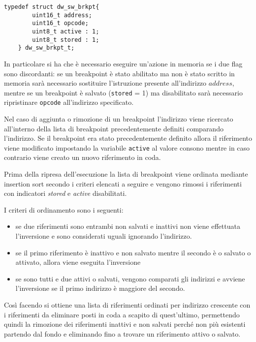 \noindent\begin{minipage}{\textwidth}
    \begin{lstlisting}[style=C, caption={Struttura utilizzata per il salvataggio dei riferimenti ai breakpoint software}, label=lst:dw-swbp-struct]
    typedef struct dw_sw_brkpt{
        uint16_t address;
        uint16_t opcode;
        uint8_t active : 1;
        uint8_t stored : 1;
    } dw_sw_brkpt_t;
    \end{lstlisting}
\end{minipage}

In particolare si ha che è necessario eseguire un'azione in memoria se i due flag sono discordanti: se un breakpoint è stato abilitato ma non è stato scritto in memoria sarà necessario sostituire l'istruzione presente all'indirizzo \(address\), mentre se un breakpoint è salvato (\texttt{stored} = 1) ma disabilitato sarà necessario ripristinare \texttt{opcode} all'indirizzo specificato.

Nel caso di aggiunta o rimozione di un breakpoint l'indirizzo viene ricercato all'interno della lista di breakpoint precedentemente definiti comparando l'indirizzo. Se il breakpoint era stato precedentemente definito allora il riferimento viene modificato impostando la variabile \texttt{active} al valore consono mentre in caso contrario viene creato un nuovo riferimento in coda.

Prima della ripresa dell'esecuzione la lista di breakpoint viene ordinata mediante insertion sort secondo i criteri elencati a seguire e vengono rimossi i riferimenti con indicatori \textit{stored} e \textit{active} disabilitati.

I criteri di ordinamento sono i seguenti:
\begin{itemize}
    \item se due riferimenti sono entrambi non salvati e inattivi non viene effettuata l'inversione e sono considerati uguali ignorando l'indirizzo.
    \item se il primo riferimento è inattivo e non salvato mentre il secondo è o salvato o attivato, allora viene eseguita l'inversione
    \item se sono tutti e due attivi o salvati, vengono comparati gli indirizzi e avviene l'inversione se il primo indirizzo è maggiore del secondo.
\end{itemize}

Così facendo si ottiene una lista di riferimenti ordinati per indirizzo crescente con i riferimenti da eliminare posti in coda a scapito di quest'ultimo, permettendo quindi la rimozione dei riferimenti inattivi e non salvati perché non più esistenti partendo dal fondo e eliminando fino a trovare un riferimento attivo o salvato.

